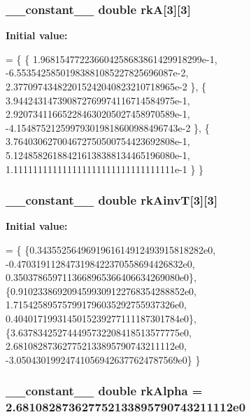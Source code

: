 \subsubsection[{\texorpdfstring{rkA}{rkA}}]{\setlength{\rightskip}{0pt plus 5cm}\+\_\+\+\_\+constant\+\_\+\+\_\+ double rkA\mbox{[}3\mbox{]}\mbox{[}3\mbox{]}}\hypertarget{radau2a_8cu_a0d840116f693430ce6f2ef4d39a4242e}{}\label{radau2a_8cu_a0d840116f693430ce6f2ef4d39a4242e}
{\bfseries Initial value\+:}
\begin{DoxyCode}
= \{ \{
     1.968154772236604258683861429918299e-1,
    -6.55354258501983881085227825696087e-2,
     2.377097434822015242040823210718965e-2
    \}, \{
     3.944243147390872769974116714584975e-1,
     2.920734116652284630205027458970589e-1,
    -4.154875212599793019818600988496743e-2
    \}, \{
     3.764030627004672750500754423692808e-1,
     5.124858261884216138388134465196080e-1,
     1.111111111111111111111111111111111e-1
    \}
\}
\end{DoxyCode}
\subsubsection[{\texorpdfstring{rk\+AinvT}{rkAinvT}}]{\setlength{\rightskip}{0pt plus 5cm}\+\_\+\+\_\+constant\+\_\+\+\_\+ double rk\+AinvT\mbox{[}3\mbox{]}\mbox{[}3\mbox{]}}\hypertarget{radau2a_8cu_a19d86e17b8ed62af599db196b69c1b7a}{}\label{radau2a_8cu_a19d86e17b8ed62af599db196b69c1b7a}
{\bfseries Initial value\+:}
\begin{DoxyCode}
= \{
\{0.3435525649691961614912493915818282e0,
-0.4703191128473198422370558694426832e0,
0.3503786597113668965366406634269080e0\},
\{0.9102338692094599309122768354288852e0,
1.715425895757991796035292755937326e0,
0.4040171993145015239277111187301784e0\},
\{3.637834252744495732208418513577775e0,
2.681082873627752133895790743211112e0,
-3.050430199247410569426377624787569e0\}
\}
\end{DoxyCode}
\subsubsection[{\texorpdfstring{rk\+Alpha}{rkAlpha}}]{\setlength{\rightskip}{0pt plus 5cm}\+\_\+\+\_\+constant\+\_\+\+\_\+ double rk\+Alpha = 2.\+681082873627752133895790743211112e0}\hypertarget{radau2a_8cu_abcf1cc253cb759bea409e311551ad323}{}\label{radau2a_8cu_abcf1cc253cb759bea409e311551ad323}
